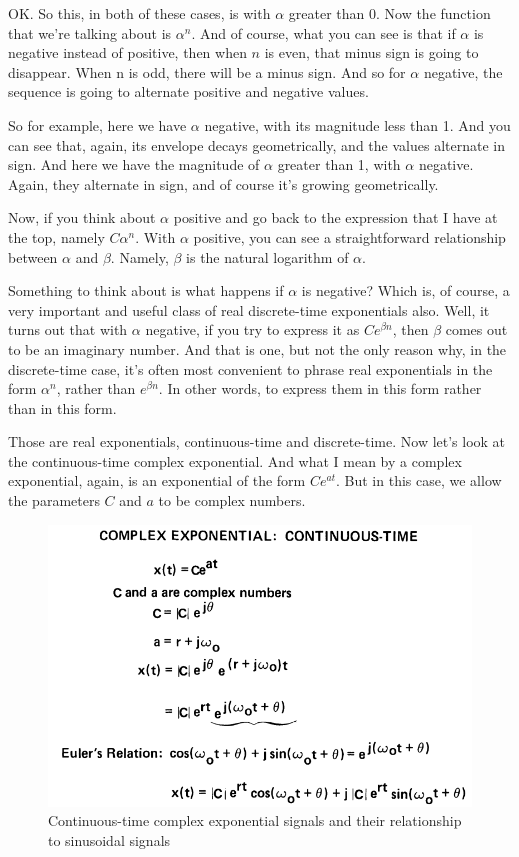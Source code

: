 \documentclass[fleqn,10pt]{olplainarticle}
\theoremstyle{definition}
\theoremstyle{remark}
\begin{document}
OK. So this, in both of these cases, is with $\alpha$ greater than 0. Now the function that we're talking about is $\alpha^n$. And of course, what you can see is that if $\alpha$ is negative instead of positive, then when $n$ is even, that minus sign is going to disappear. When n is odd, there will be a minus sign. And so for $\alpha$ negative, the sequence is going to alternate positive and negative values.

So for example, here we have $\alpha$ negative, with its magnitude less than 1. And you can see that, again, its envelope decays geometrically, and the values alternate in sign. And here we have the magnitude of $\alpha$ greater than 1, with $\alpha$ negative. Again, they alternate in sign, and of course it's growing geometrically.

Now, if you think about $\alpha$ positive and go back to the expression that I have at the top, namely $C \alpha^n$. With $\alpha$ positive, you can see a straightforward relationship between $\alpha$ and $\beta$. Namely, $\beta$ is the natural logarithm of $\alpha$.

Something to think about is what happens if $\alpha$ is negative? Which is, of course, a very important and useful class of real discrete-time exponentials also. Well, it turns out that with $\alpha$ negative, if you try to express it as $Ce^{\beta n}$, then $\beta$ comes out to be an imaginary number. And that is one, but not the only reason why, in the discrete-time case, it's often most convenient to phrase real exponentials in the form $\alpha^n$, rather than $e^{\beta n}$. In other words, to express them in this form rather than in this form.

Those are real exponentials, continuous-time and discrete-time. Now let's look at the continuous-time complex exponential. And what I mean by a complex exponential, again, is an exponential of the form $Ce^{at}$. But in this case, we allow the parameters $C$ and $a$ to be complex numbers.

\begin{figure}[ht]
	\centering
	\includegraphics[width=0.7\linewidth]{images/signals_17.png}
	\caption{Continuous-time complex exponential signals and their relationship to sinusoidal signals}
	\label{fig:signals_17}
\end{figure}
\end{document}
